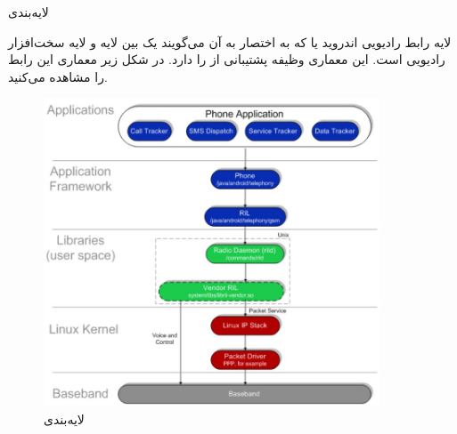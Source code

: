 \Problem
{لایه‌بندی }
{
لایه رابط رادیویی اندروید یا
که به اختصار به آن
می‌گویند یک
بین لایه
و لایه سخت‌افزار رادیویی است.
این معماری وظیفه پشتیبانی از
را دارد.
در شکل زیر معماری این رابط را مشاهده می‌کنید.

\begin{figure}[H]
    \includegraphics[width=10cm]{Images/RIL.jpg}
    \centering
    \caption{لایه‌بندی }
\end{figure}
}
